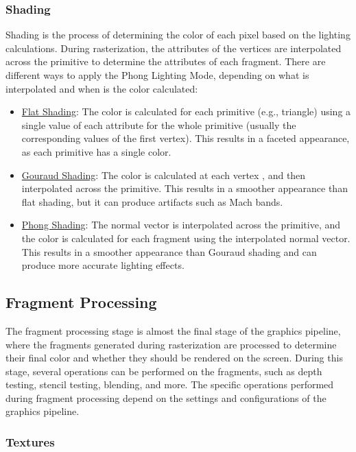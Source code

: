 \subsubsection{Shading}

Shading is the process of determining the color of each pixel based on the lighting calculations. During rasterization, the attributes of the vertices are interpolated across the primitive to determine the attributes of each fragment. There are different ways to apply the Phong Lighting Mode, depending on what is interpolated and when is the color calculated:
\begin{itemize}
    \item \ul{Flat Shading}: The color is calculated for each primitive (e.g., triangle) using a single value of each attribute for the whole primitive (usually the corresponding values of the first vertex). This results in a faceted appearance, as each primitive has a single color.
    \item \ul{Gouraud Shading}: The color is calculated at each vertex , and then interpolated across the primitive. This results in a smoother appearance than flat shading, but it can produce artifacts such as Mach bands.
    \item \ul{Phong Shading}: The normal vector is interpolated across the primitive, and the color is calculated for each fragment using the interpolated normal vector. This results in a smoother appearance than Gouraud shading and can produce more accurate lighting effects.
\end{itemize}

\subsection{Fragment Processing}

The fragment processing stage is almost the final stage of the graphics pipeline, where the fragments generated during rasterization are processed to determine their final color and whether they should be rendered on the screen. During this stage, several operations can be performed on the fragments, such as depth testing, stencil testing, blending, and more. The specific operations performed during fragment processing depend on the settings and configurations of the graphics pipeline.

\subsubsection{Textures}


